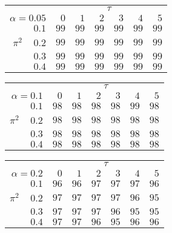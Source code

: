 \begin{tabular}{r|rrrrrr}
\hline\hline
 &\multicolumn{6}{c}{$\tau$} \\ 
 $\alpha = 0.05$ & $0$ & $1$ & $2$ & $3$ & $4$ & $5$ \\ 
 \hline$0.1$ & $99$ & $99$ & $99$ & $99$ & $99$ & $99$\\ 
$\pi^2\;\;\;$ $0.2$ & $99$ & $99$ & $99$ & $99$ & $99$ & $99$\\ 
$0.3$ & $99$ & $99$ & $99$ & $99$ & $99$ & $99$\\ 
$0.4$ & $99$ & $99$ & $99$ & $99$ & $99$ & $99$\\ 
 \hline 
 \end{tabular}
 
 \vspace{2em} 
 
\begin{tabular}{r|rrrrrr}
\hline\hline
 &\multicolumn{6}{c}{$\tau$} \\ 
 $\alpha = 0.1$ & $0$ & $1$ & $2$ & $3$ & $4$ & $5$ \\ 
 \hline$0.1$ & $98$ & $98$ & $98$ & $98$ & $99$ & $98$\\ 
$\pi^2\;\;\;$ $0.2$ & $98$ & $98$ & $98$ & $98$ & $98$ & $98$\\ 
$0.3$ & $98$ & $98$ & $98$ & $98$ & $98$ & $98$\\ 
$0.4$ & $98$ & $98$ & $98$ & $98$ & $98$ & $98$\\ 
 \hline 
 \end{tabular}
 
 \vspace{2em} 
 
\begin{tabular}{r|rrrrrr}
\hline\hline
 &\multicolumn{6}{c}{$\tau$} \\ 
 $\alpha = 0.2$ & $0$ & $1$ & $2$ & $3$ & $4$ & $5$ \\ 
 \hline$0.1$ & $96$ & $96$ & $97$ & $97$ & $97$ & $96$\\ 
$\pi^2\;\;\;$ $0.2$ & $97$ & $97$ & $97$ & $97$ & $96$ & $95$\\ 
$0.3$ & $97$ & $97$ & $97$ & $96$ & $95$ & $95$\\ 
$0.4$ & $97$ & $97$ & $96$ & $95$ & $96$ & $96$\\ 
 \hline 
 \end{tabular}